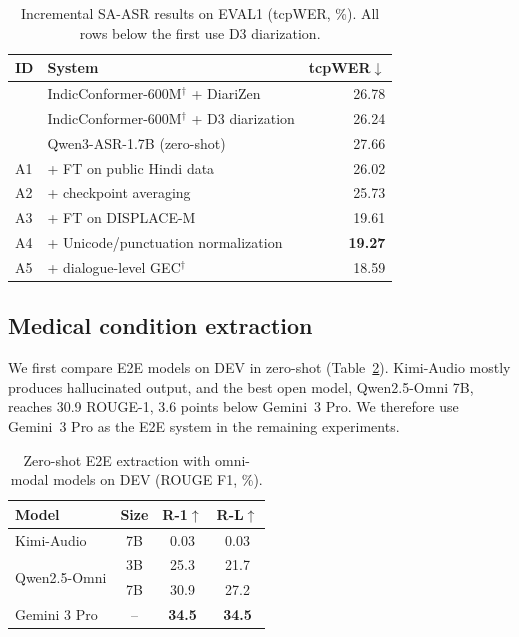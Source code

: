 \documentclass{article}
\begin{document}
\begin{table}[H]
  \centering
  \caption{Incremental SA-ASR results on EVAL1 (tcpWER, \%). All rows below the first use D3 diarization.}
  \label{tab:asr}
  \vspace{1mm}
  \setlength{\tabcolsep}{4pt}
  \begin{tabular}{l l r}
    \toprule
    \textbf{ID} & \textbf{System} & \textbf{tcpWER}$\downarrow$ \\
    \midrule
     & IndicConformer-600M\hyperlink{fn:indic}{$^\dagger$} + DiariZen & 26.78 \\
      & IndicConformer-600M\hyperlink{fn:indic}{$^\dagger$} + D3 diarization & 26.24 \\
    \midrule
     & Qwen3-ASR-1.7B (zero-shot) & 27.66 \\
    A1 & \quad + FT on public Hindi data & 26.02 \\
    A2 & \quad + checkpoint averaging & 25.73 \\
    A3 & \quad + FT on DISPLACE-M & 19.61 \\
    A4 & \quad + Unicode/punctuation normalization & \textbf{19.27} \\
    A5 & \quad + dialogue-level GEC$^\dagger$ & 18.59 \\
    \bottomrule
  \end{tabular}
\end{table}
{\renewcommand{\thefootnote}{$^\dagger$}%
 }



\subsection{Medical condition extraction}
\label{ssec:res-extract}

We first compare E2E models on DEV in zero-shot (Table~\ref{tab:omni}).
Kimi-Audio mostly produces hallucinated output, and the best open model, Qwen2.5-Omni 7B, reaches 30.9 ROUGE-1, 3.6 points below Gemini~3 Pro.
We therefore use Gemini~3 Pro as the E2E system in the remaining experiments.


\begin{table}[H]
  \centering
  \caption{Zero-shot E2E extraction with omni-modal models on DEV (ROUGE F1, \%).}
  \label{tab:omni}
  \vspace{1mm}
  \small
  \begin{tabular}{l c c c}
    \toprule
    \textbf{Model} & \textbf{Size} & \textbf{R-1}$\uparrow$ & \textbf{R-L}$\uparrow$ \\
    \midrule
    Kimi-Audio & 7B   & 0.03 & 0.03 \\
    \midrule
\multirow{2}{*}{Qwen2.5-Omni} & 3B & 25.3 & 21.7 \\
                              & 7B & 30.9 & 27.2 \\
    \midrule
    Gemini 3 Pro & --   & \textbf{34.5} & \textbf{34.5} \\
    \bottomrule
  \end{tabular}
\end{table}
\end{document}
